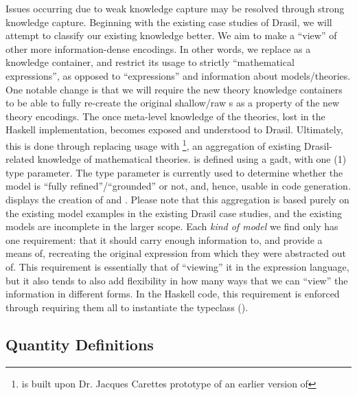 Issues occurring due to weak knowledge capture may be resolved through strong
knowledge capture. Beginning with the existing case studies of Drasil, we will
attempt to classify our existing knowledge better. We aim to make
\RelationConcept{} a ``view'' of other more information-dense encodings. In
other words, we replace \Expr{} as a knowledge container, and restrict its usage
to strictly ``mathematical expressions'', as opposed to ``expressions'' and
information about models/theories. One notable change is that we will require
the new theory knowledge containers to be able to fully re-create the original
shallow/raw \Expr{}s as a property of the new theory encodings. The once
meta-level knowledge of the theories, lost in the Haskell implementation,
becomes exposed and understood to Drasil. Ultimately, this is done through
replacing \RelationConcept{} usage with \ModelKind{}\footnote{\ModelKind{} is
built upon Dr. Jacques Carettes prototype of an earlier version of
\ModelKinds{}}, an aggregation of existing Drasil-related knowledge of
mathematical theories. \ModelKind{} is defined using a \acs{gadt}, with one (1)
type parameter. The type parameter is currently used to determine whether the
model is ``fully refined''/``grounded'' or not, and, hence, usable in code
generation.  displays the creation of \ModelKind{}
and \ModelKinds{}. Please note that this aggregation is based purely on the
existing model examples in the existing Drasil case studies, and the existing
models are incomplete in the larger scope. Each \textit{kind of model} we find
only has one requirement: that it should carry enough information to, and
provide a means of, recreating the original expression from which they were
abstracted out of. This requirement is essentially that of ``viewing'' it in the
expression language, but it also tends to also add flexibility in how many ways
that we can ``view'' the information in different forms. In the Haskell code,
this requirement is enforced through requiring them all to instantiate the
\Express{} typeclass ().

\currentModelKindsHaskell{}

\subsection{Quantity Definitions}

\currentQDefinitionHaskell{}

